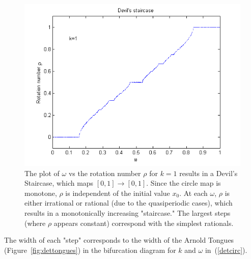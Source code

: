 \begin{figure}[!h]
\caption[The Devil's Staircase for the deterministic circle map]{The
  plot of $\omega$ vs the rotation number $\rho$ for $k=1$ results in a Devil's
  Staircase, which maps $[0,1]\to [0,1]$. Since the circle map is monotone, $\rho$ is independent of
  the initial value $x_0$. At each $\omega$, $\rho$ is either
  irrational or rational (due to the quasiperiodic cases), which results in a monotonically increasing
  "staircase." The largest steps (where $\rho$ appears constant)
  correspond with the simplest rationals.}\label{fig:devil_det}
	\begin{center}
		\includegraphics[scale=0.7]{figs/devil_nonrandom_k1.png}
	\end{center}
\end{figure}
The width of each "step" corresponds to the width of the Arnold
Tongues (Figure~\ref{fig:dettongues}) in the bifurcation diagram for $k$ and $\omega$ in~(\ref{detcirc}). 

